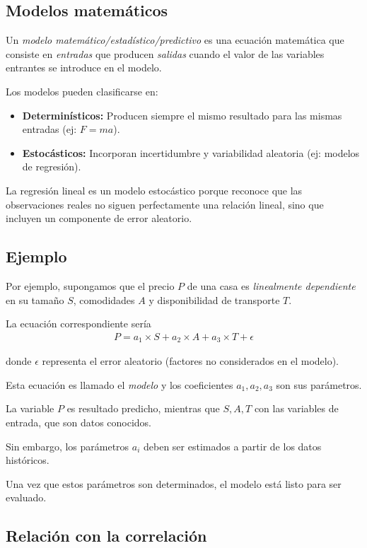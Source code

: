 \subsection{Modelos matemáticos}
Un \emph{modelo matemático/estadístico/predictivo} es una ecuación matemática que consiste en \emph{entradas} que producen \emph{salidas} cuando el valor de las variables entrantes se introduce en el modelo.

Los modelos pueden clasificarse en:
\begin{itemize}
	\item \textbf{Determinísticos:} Producen siempre el mismo resultado para las mismas entradas (ej: $F = ma$).
	\item \textbf{Estocásticos:} Incorporan incertidumbre y variabilidad aleatoria (ej: modelos de regresión).
\end{itemize}

La regresión lineal es un modelo estocástico porque reconoce que las observaciones reales no siguen perfectamente una relación lineal, sino que incluyen un componente de error aleatorio.

\subsection{Ejemplo}
Por ejemplo, supongamos que el precio $P$ de una casa es \emph{linealmente dependiente} en su tamaño $S$, comodidades $A$ y disponibilidad de transporte $T$.



La ecuación correspondiente sería
\begin{align}
	P = a_{1}\times S+ a_{2} \times A + a_{3} \times T + \epsilon
\end{align}

donde $\epsilon$ representa el error aleatorio (factores no considerados en el modelo).


Esta ecuación es llamado el \emph{modelo} y los coeficientes $a_{1},a_{2},a_{3}$ son sus parámetros.



La variable $P$ es resultado predicho, mientras que $S,A,T$ con las variables de entrada, que son datos conocidos.


Sin embargo, los parámetros $a_{i}$ deben ser estimados a partir de los datos históricos.


Una vez que estos parámetros son determinados, el modelo está listo para ser evaluado.

\subsection{Relación con la correlación}

